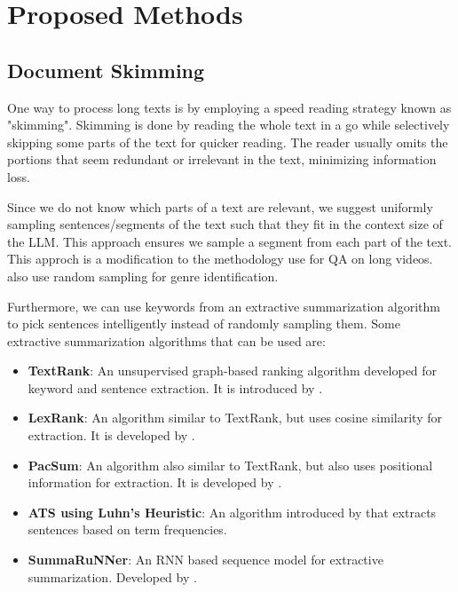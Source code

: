 \section{Proposed Methods}


\subsection{Document Skimming}

One way to process long texts is by employing a speed reading strategy known as
"skimming".
Skimming is done by reading the whole text in a go while selectively skipping some
parts of the text for quicker reading.
The reader usually omits the portions that seem redundant or irrelevant in the text,
minimizing information loss.

Since we do not know which parts of a text are relevant, we suggest uniformly sampling
sentences/segments of the text such that they fit in the context size of the LLM.
This approach ensures we sample a segment from each part of the text.
This approch is a modification to the methodology \citet{wang2024videoagent} use for
QA on long videos. \citet{worsham-kalita-2018-genre} also use random sampling for genre
identification.

Furthermore, we can use keywords from an extractive summarization algorithm to pick
sentences intelligently instead of randomly sampling them.
Some extractive summarization algorithms that can be used are:

\begin{itemize}
	\item \textbf{TextRank}: An unsupervised graph-based ranking algorithm developed for
	keyword and sentence extraction. It is introduced by
	\citet{mihalcea-tarau-2004-textrank}.
	\item \textbf{LexRank}: An algorithm similar to TextRank, but uses cosine similarity
	for extraction. It is developed by \citet{erkan2004lexrank}.
	\item \textbf{PacSum}: An algorithm also similar to TextRank, but also uses
	positional information for extraction. It is developed by
	\citet{zheng-lapata-2019-sentence}.
	\item \textbf{ATS using Luhn's Heuristic}: An algorithm introduced by
	\citet{10188527} that extracts sentences based on term frequencies.
	\item \textbf{SummaRuNNer}: An RNN based sequence model for extractive summarization.
	Developed by \citet{Nallapati_Zhai_Zhou_2017}.
\end{itemize}


